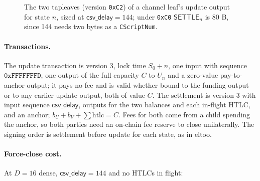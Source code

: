 \begin{figure}[tbp]
\centering\small
\begin{pchstack}[center]
\pchspace
{}
\end{pchstack}
\caption{The two tapleaves (version \texttt{0xC2}) of a channel leaf's update output for state $n$, sized at $\mathsf{csv\_delay} = 144$; under \texttt{0xC0} $\mathsf{SETTLE}_n$ is 80 B, since 144 needs two bytes as a \texttt{CScriptNum}.}
\label{fig:chan}
\end{figure}

\paragraph{Transactions.} The update transaction is version 3, lock time
$S_0 + n$, one input with sequence $\mathtt{0xFFFFFFFD}$, one output of the
full capacity $C$ to $U_n$ and a zero-value pay-to-anchor output; it pays
no fee and is valid whether bound to the funding output or to any earlier
update output, both of value $C$. The settlement is version 3 with input
sequence $\mathsf{csv\_delay}$, outputs for the two balances and each
in-flight HTLC, and an anchor; $b_U + b_V + \sum \mathrm{htlc} = C$. Fees
for both come from a child spending the anchor, so both parties need an
on-chain fee reserve to close unilaterally. The signing order is
settlement before update for each state, as in eltoo.

\paragraph{Force-close cost.} At $D = 16$ dense, $\mathsf{csv\_delay} =
144$ and no HTLCs in flight:

